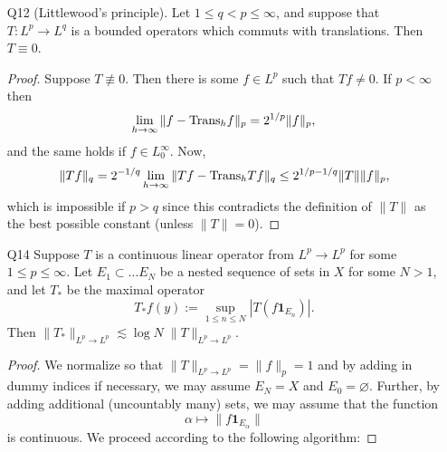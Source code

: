 \documentclass[11pt]{article}
\theoremstyle{remark}
\newcommand{\1}{\textbf{1}}
\newcommand{\lle}{\lesssim}
\def\norm#1{\| #1  \|}
\newcommand{\bbR}{\mathbb{R}}
\begin{document}
\begin{enumerate}
\begin{proof}
\begin{align*}
\end{align*}
and we apply H\"older's to conclude. The other cases follow similarly.
\end{proof}
\item[Q12] (Littlewood's principle). Let $1\leq q < p \leq \infty$, and suppose that $T: L^p \to L^q$ is a bounded operators which commuts with translations. Then $T \equiv 0$.
\begin{proof}
Suppose $T \not \equiv 0$. Then there is some $f \in L^p$ such that $Tf \neq 0$. If $p < \infty$ then
\[
\lim_{h \to \infty} \norm{f - \textup{Trans}_h f}_{p} = 2^{1/p} \norm{f}_p,
\]
and the same holds if $f \in L_0^\infty$. Now,
\[
\norm{Tf}_q = 2^{-1/q} \lim_{h \to \infty} \norm{Tf - \textup{Trans}_h Tf}_{q} \leq 2^{1/p-1/q} \norm{T}  \norm{f}_p,
\]
which is impossible if $p > q$ since this contradicts the definition of $\norm{T}$ as the best possible constant (unless $\norm{T} = 0$).
\end{proof}
\item[Q14]
Suppose $T$ is a continuous linear operator from $L^p \to L^p$ for some $1 \leq p \leq \infty$. Let $E_1 \subset \ldots E_N$ be a nested sequence of sets in $X$ for some $N > 1$, and let $T_*$ be the maximal operator
\[
T_* f(y) := \sup_{1 \leq n \leq N} |T(f\1_{E_n})|.
\]
Then $\norm{T_*}_{L^p \to L^p} \lle \log N \;\norm{T}_{L^p \to L^p}$.
\begin{proof}
We normalize so that $\norm{T}_{L^p \to L^p} = \norm{f}_p = 1$ and by adding in dummy indices if necessary, we may assume $E_N = X$ and $E_0 = \varnothing$. Further, by adding additional (uncountably many) sets, we may assume that the function
\[
\alpha \mapsto \norm{f\1_{E_\alpha} }
\]
is continuous. We proceed according to the following algorithm:


\end{proof}
\end{enumerate}
\end{document}
